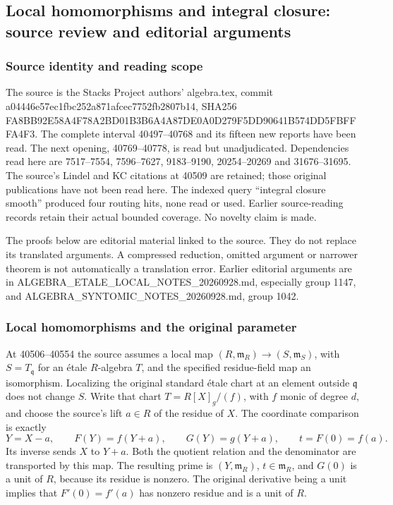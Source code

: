 \subsection{Local homomorphisms and integral closure: source review and editorial arguments}\label{local-homomorphisms-and-integral-closure-source-review-and-editorial-arguments}

\subsubsection{Source identity and reading scope}\label{source-identity-and-reading-scope}

The source is the Stacks Project authors' algebra.tex, commit a04446e57ec1fbc252a871afcec7752fb2807b14, SHA256 FA8BB92E58A4F78A2BD01B3B6A4A87DE0A0D279F5DD90641B574DD5FBFFFA4F3. The complete interval 40497--40768 and its fifteen new reports have been read. The next opening, 40769--40778, is read but unadjudicated. Dependencies read here are 7517--7554, 7596--7627, 9183--9190, 20254--20269 and 31676--31695. The source's Lindel and KC citations at 40509 are retained; those original publications have not been read here. The indexed query ``integral closure smooth'' produced four routing hits, none read or used. Earlier source-reading records retain their actual bounded coverage. No novelty claim is made.

The proofs below are editorial material linked to the source. They do not replace its translated arguments. A compressed reduction, omitted argument or narrower theorem is not automatically a translation error. Earlier editorial arguments are in ALGEBRA\_ETALE\_LOCAL\_NOTES\_20260928.md, especially group 1147, and ALGEBRA\_SYNTOMIC\_NOTES\_20260928.md, group 1042.

\subsubsection{Local homomorphisms and the original parameter}\label{local-homomorphisms-and-the-original-parameter}

At 40506--40554 the source assumes a local map \((R,\mathfrak m_R)\to(S,\mathfrak m_S)\), with \(S=T_{\mathfrak q}\) for an étale \(R\)-algebra \(T\), and the specified residue-field map an isomorphism. Localizing the original standard étale chart at an element outside \(\mathfrak q\) does not change \(S\). Write that chart \(T=R[X]_g/(f)\), with \(f\) monic of degree \(d\), and choose the source's lift \(a\in R\) of the residue of \(X\). The coordinate comparison is exactly \[
Y=X-a,\qquad F(Y)=f(Y+a),\qquad G(Y)=g(Y+a),\qquad
t=F(0)=f(a).
\] Its inverse sends \(X\) to \(Y+a\). Both the quotient relation and the denominator are transported by this map. The resulting prime is \((Y,\mathfrak m_R)\), \(t\in\mathfrak m_R\), and \(G(0)\) is a unit of \(R\), because its residue is nonzero. The original derivative being a unit implies that \(F'(0)=f'(a)\) has nonzero residue and is a unit of \(R\).

